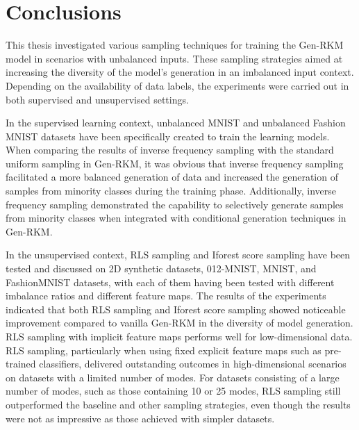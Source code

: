 \chapter{Conclusions}
\label{chap-conclu}
This thesis investigated various sampling techniques for training the Gen-RKM model in scenarios with unbalanced inputs. These sampling strategies aimed at increasing the diversity of the model's generation in an imbalanced input context. Depending on the availability of data labels, the experiments were carried out in both supervised and unsupervised settings. 

In the supervised learning context, unbalanced MNIST and unbalanced Fashion MNIST datasets have been specifically created to train the learning models. When comparing the results of inverse frequency sampling with the standard uniform sampling in Gen-RKM, it was obvious that inverse frequency sampling facilitated a more balanced generation of data and increased the generation of samples from minority classes during the training phase. Additionally, inverse frequency sampling demonstrated the capability to selectively generate samples from minority classes when integrated with conditional generation techniques in Gen-RKM.

In the unsupervised context, RLS sampling and Iforest score sampling have been tested and discussed on 2D synthetic datasets, 012-MNIST, MNIST, and FashionMNIST datasets, with each of them having been tested with different imbalance ratios and different feature maps. The results of the experiments indicated that both RLS sampling and Iforest score sampling showed noticeable improvement compared to vanilla Gen-RKM in the diversity of model generation. RLS sampling with implicit feature maps performs well for low-dimensional data. RLS sampling, particularly when using fixed explicit feature maps such as pre-trained classifiers, delivered outstanding outcomes in high-dimensional scenarios on datasets with a limited number of modes. For datasets consisting of a large number of modes, such as those containing 10 or 25 modes, RLS sampling still outperformed the baseline and other sampling strategies, even though the results were not as impressive as those achieved with simpler datasets. 

